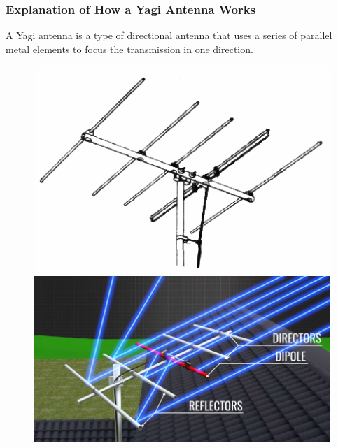 \documentclass{beamer}
\begin{document}
\begin{frame}
    \frametitle{Explanation of How a Yagi Antenna Works}
    A Yagi antenna is a type of directional antenna that uses a series of parallel metal elements to focus the transmission in one direction.


        \begin{figure}[htbp]
        \begin{minipage}[b]{0.5\linewidth}
            \centering
            \includegraphics[width=0.8\linewidth]{yagi.png}
            \pause
            
            \end{minipage}%
            \begin{minipage}[b]{0.5\linewidth}
            \centering
            \includegraphics[width=0.8\linewidth]{yagibeam.png}
        \end{minipage}
        \end{figure}
        
\end{frame}
\end{document}
